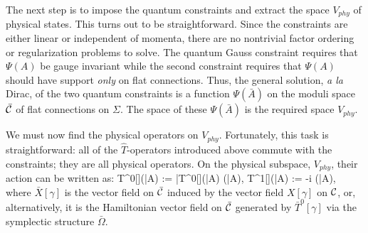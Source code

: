 The next step is to impose the quantum constraints and extract the space
$V_{phy}$ of physical states. This turns out to be straightforward. Since the
constraints are either linear or independent of momenta, there are no
nontrivial factor ordering or regularization problems to solve. The quantum
Gauss constraint requires that $\Psi (A)$ be gauge invariant while the second
constraint requires that $\Psi (A)$ should have support {\it only} on flat
connections. Thus, the general solution, {\it a la} Dirac, of the two quantum
constraints is a function $\Psi (\bar{A})$ on the moduli space $\bar{\cal C}$
of flat connections on $\Sigma$. The space of these $\Psi(\bar{A})$ is the
required space $V_{phy}$.

We must now find the physical operators on $V_{phy}$. Fortunately, this task
is straightforward: all of the ${\hat T}$-operators introduced above commute
with the constraints; they are all physical operators. On the physical
subspace, $V_{phy}$, their action can be written as:
\bneq
{\hat T}^0[\gamma ]\cdot\Psi (\bar{A}) := \bar{T}^0[\gamma](\bar{A})
  \cdot\Psi (\bar{A}),  \quad
  {\hat T}^1[\gamma ]\cdot\Psi (\bar{A}) := -i\hbar{} \Psi
  (\bar{A}),
where $\bar{X}[\gamma ]$ is the vector field on $\bar{\cal C}$ induced by the
vector field $X[\gamma ]$ on ${\cal C}$, or,  alternatively, it is the
Hamiltonian vector field on $\bar{\cal C}$ generated by $\bar{T}^0[\gamma ]$
via the symplectic structure $\bar\Omega$.

